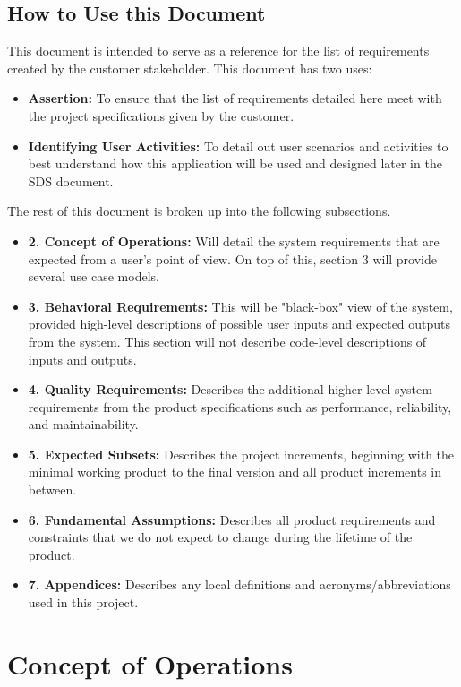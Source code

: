 \documentclass[a4paper, 11pt]{article}
\begin{document}
\subsection{How to Use this Document}
This document is intended to serve as a reference for the list of requirements created by the customer stakeholder. This document has two uses:
\begin{itemize}
	\item \textbf{Assertion:} To ensure that the list of requirements detailed here meet with the project specifications given by the customer.
	\item \textbf{Identifying User Activities:} To detail out user scenarios and activities to best understand how this application will be used and designed later in the SDS document.
\end{itemize}
The rest of this document is broken up into the following subsections.
\begin{itemize}
	\item \textbf{2. Concept of Operations:} Will detail the system requirements that are expected from a user's point of view. On top of this, section 3 will provide several use case models.
	\item \textbf{3. Behavioral Requirements:} This will be  "black-box" view of the system, provided high-level descriptions of possible user inputs and expected outputs from the system. This section will not describe code-level descriptions of inputs and outputs.
	\item \textbf{4. Quality Requirements:} Describes the additional higher-level system requirements from the product specifications such as performance, reliability, and maintainability.
	\item \textbf{5. Expected Subsets:} Describes the project increments, beginning with the minimal working product to the final version and all product increments in between.
	\item \textbf{6. Fundamental Assumptions:} Describes all product requirements and constraints that we do not expect to change during the lifetime of the product.
	\item \textbf{7. Appendices:} Describes any local definitions and acronyms/abbreviations used in this project.
\end{itemize}

\section{Concept of Operations}
\end{document}
